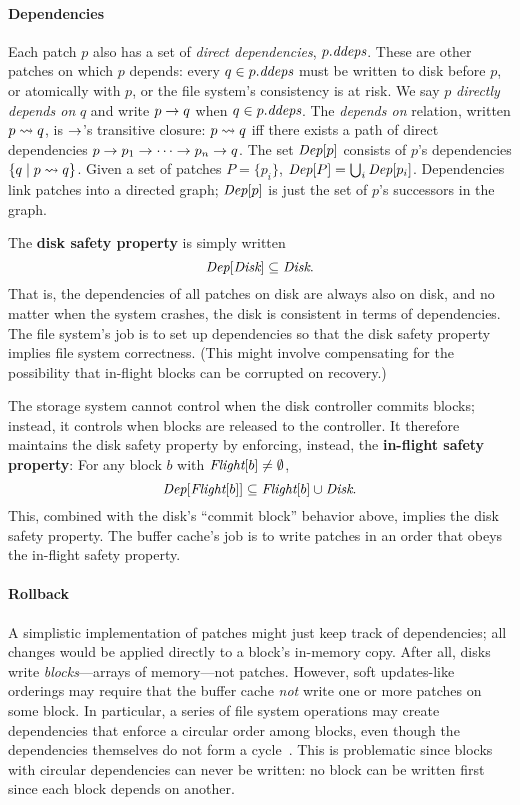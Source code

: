 \paragraph{Dependencies}
%
Each patch $p$ also has a set of \emph{direct dependencies}, $\PDDepset{p}$.
%
These are other patches on which $p$ depends: every $q \in \PDDepset{p}$
must be written to disk before $p$, or atomically with $p$, or the file
system's consistency is at risk.
%
We say $p$ \emph{directly depends on} $q$ and write $p \rightarrow q$ when $q
\in \PDDepset{p}$.
%
The \emph{depends on} relation, written $p \leadsto q$, is $\rightarrow$'s
transitive closure: $p \leadsto q$ iff there exists a path of direct
dependencies $p \rightarrow p_1 \rightarrow \cdots \rightarrow p_n \rightarrow q$.
%
The set $\textit{Dep}[p]$ consists of $p$'s dependencies $\{q \mid p \leadsto
q \}$.
%
Given a set of patches $P = \{p_i\}$, $\textit{Dep}[P] = \bigcup_i
\textit{Dep}[p_i]$.
%
Dependencies link patches into a directed graph; $\textit{Dep}[p]$ is just the
set of $p$'s successors in the graph.


The \textbf{disk safety property} is simply written
%
\[ \PDepset{\PDisk} \subseteq \PDisk. \]
%
That is, the dependencies of all patches on disk are always also on disk,
and
%
no matter when the system crashes, the disk is consistent in terms of
dependencies.
%
The file system's job is to set up dependencies so that the disk safety
property implies file system correctness.
%
(This might involve compensating for the possibility that in-flight blocks
can be corrupted on recovery.)


The storage system cannot control when the disk controller commits blocks;
instead, it controls when blocks are released to the controller.
%
It therefore maintains the disk safety property by enforcing, instead, the
\textbf{in-flight safety property}: For any block $b$ with $\PInf[b] \neq
\emptyset$,
%
\[ \PDepset{\PInf[b]} \subseteq \PInf[b] \cup \PDisk . \]
%
This, combined with the disk's ``commit block'' behavior above, implies the
disk safety property.
%
The buffer cache's job is to write patches in an order that obeys the
in-flight safety property.


\paragraph{Rollback}
%
A simplistic implementation of patches might just keep track of
dependencies; all changes would be applied directly to a block's in-memory
copy.
%
After all, disks write \emph{blocks}---arrays of memory---not patches.
%
However, soft updates-like orderings may require that the buffer cache
\emph{not} write one or more patches on some block.
%
In particular, a series of file system operations may create dependencies
that enforce a circular order among blocks, even though the dependencies
themselves do not form a cycle~\cite{ganger00soft}.
%
This is problematic since blocks with circular dependencies can never be
written: no block can be written first since each block depends on another.



